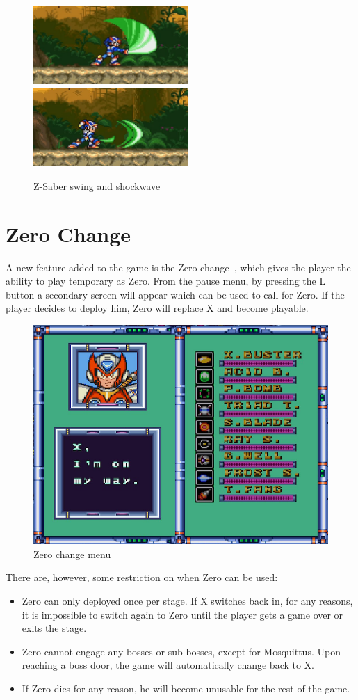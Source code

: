 \begin{figure}[htp] 
	\centering
	\includegraphics[height=3cm]{figures/X3/weapons/Z_saber_1.png}
	\includegraphics[height=3cm]{figures/X3/weapons/Z_saber_2.png}
	\caption{Z-Saber swing and shockwave}
\end{figure}

\section{Zero Change}\label{X3:Zero}
A new feature added to the game is the Zero change~\cite{wiki:Zero_change}, which gives the player the ability to play temporary as Zero. From the pause menu, by pressing the L button a secondary screen will appear which can be used to call for Zero. If the player decides to deploy him, Zero will replace X and become playable. 
\begin{figure}[htp] 
	\centering
	\includegraphics[width=.5\linewidth]{figures/X3/weapons/Zero_screen.png}
	\caption{Zero change menu}
\end{figure}
There are, however, some restriction on when Zero can be used:
\begin{itemize}
	\item Zero can only deployed once per stage. If X switches back in, for any reasons, it is impossible to switch again to Zero until the player gets a game over or exits the stage.
	\item Zero cannot engage any bosses or sub-bosses, except for Mosquittus. Upon reaching a boss door, the game will automatically change back to X.
	\item If Zero dies for any reason, he will become unusable for the rest of the game.
\end{itemize}

